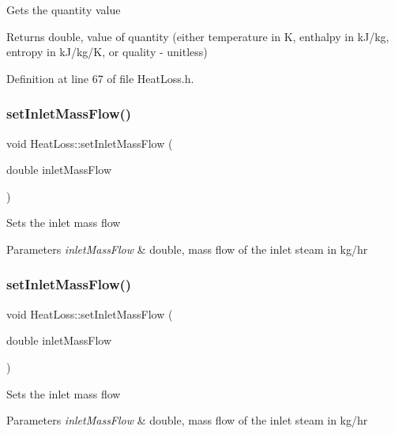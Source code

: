 Gets the quantity value \begin{DoxyReturn}{Returns}
double, value of quantity (either temperature in K, enthalpy in k\+J/kg, entropy in k\+J/kg/K, or quality -\/ unitless) 
\end{DoxyReturn}


Definition at line 67 of file Heat\+Loss.\+h.

\mbox{\label{class_heat_loss_ac4154dc9922b6ddf3f2e7a10cc64c61f}} 
\subsubsection{\texorpdfstring{set\+Inlet\+Mass\+Flow()}{setInletMassFlow()}\hspace{0.1cm}{\footnotesize\ttfamily [1/3]}}
{\footnotesize\ttfamily void Heat\+Loss\+::set\+Inlet\+Mass\+Flow (\begin{DoxyParamCaption}\item[{double}]{inlet\+Mass\+Flow }\end{DoxyParamCaption})}

Sets the inlet mass flow 
\begin{DoxyParams}{Parameters}
{\em inlet\+Mass\+Flow} & double, mass flow of the inlet steam in kg/hr \\
\hline
\end{DoxyParams}
\mbox{\label{class_heat_loss_ac4154dc9922b6ddf3f2e7a10cc64c61f}} 
\subsubsection{\texorpdfstring{set\+Inlet\+Mass\+Flow()}{setInletMassFlow()}\hspace{0.1cm}{\footnotesize\ttfamily [2/3]}}
{\footnotesize\ttfamily void Heat\+Loss\+::set\+Inlet\+Mass\+Flow (\begin{DoxyParamCaption}\item[{double}]{inlet\+Mass\+Flow }\end{DoxyParamCaption})}

Sets the inlet mass flow 
\begin{DoxyParams}{Parameters}
{\em inlet\+Mass\+Flow} & double, mass flow of the inlet steam in kg/hr \\
\hline
\end{DoxyParams}


